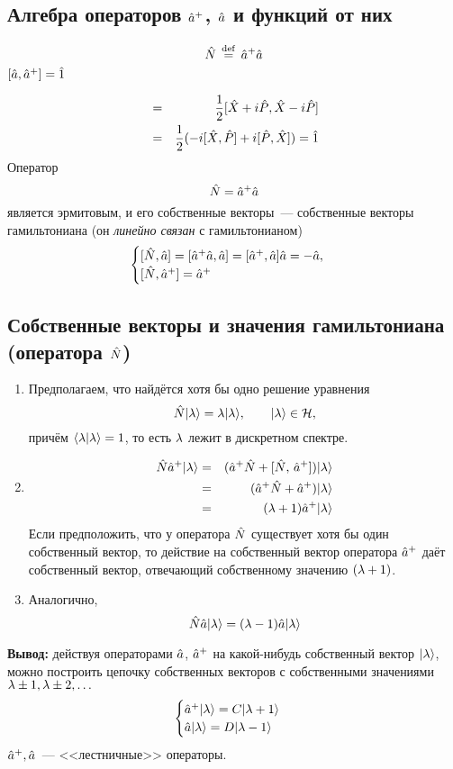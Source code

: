\subsection{Алгебра операторов $\Hat a^+$, $\Hat a$ и функций от них}
$$
    \Hat N \,\overset{\mathrm{def}}{=}\, \Hat a^+ \Hat a
$$
\Lem $[\Hat a, \Hat a^+] = \Hat 1$

\Proof
\begin{eqnarray*}
    [\hat a, \hat a^+] &=& \dfrac12 [\Hat X + i \Hat P, \Hat X - i \hat P]\\
                        &=& \dfrac12 (-i [\Hat X, \Hat P] + i [\Hat P, \Hat X]) = \Hat 1
\end{eqnarray*}
Оператор
$$
    \hat N = \Hat a^+ \Hat a
$$
является эрмитовым, и его собственные векторы~--- собственные векторы гамильтониана (он \emph{линейно связан} с гамильтонианом)
$$
\begin{cases}
    [\Hat N, \Hat a] = [\Hat a^+ \Hat a, \Hat a] = [\Hat a^+, \Hat a]\Hat a = -\Hat a,\\
    [\Hat N, \Hat a^+] = \Hat a^+
\end{cases}
$$
\subsection[Собственные векторы и значения $\Hat H, \Hat N$]{Собственные векторы и значения гамильтониана (оператора $\Hat N$)}
\begin{enumerate}
  \item Предполагаем, что найдётся хотя бы одно решение уравнения
  $$
    \Hat N | \lambda \rangle = \lambda | \lambda \rangle, \qquad | \lambda \rangle \in \mathcal H,
  $$
  причём $\langle \lambda | \lambda \rangle = 1$, то есть $\lambda$ лежит в дискретном спектре.
  \item
  \begin{eqnarray*}
    \Hat N \Hat a^+ | \lambda \rangle &=& (\Hat a^+ \Hat N + [\Hat N, \, \hat a^+]) | \lambda \rangle\\
    &=& (\Hat a^+ \Hat N + \Hat a^+ ) | \lambda \rangle \\
    &=& (\lambda+1) \Hat a^+ | \lambda \rangle
  \end{eqnarray*}
  Если предположить, что у оператора $\Hat N$ существует хотя бы один собственный вектор, то действие на собственный вектор оператора $\Hat a^+$ даёт собственный вектор, отвечающий собственному значению $(\lambda + 1)$.
  \item Аналогично,
  $$
    \Hat N \Hat a | \lambda \rangle = (\lambda - 1) \Hat a | \lambda \rangle
  $$
\end{enumerate}
\textbf{Вывод:}
действуя операторами $\Hat a$, $\Hat a^+$ на какой-нибудь собственный вектор $| \lambda \rangle$, можно построить цепочку собственных векторов с собственными значениями $\lambda \pm 1, \lambda \pm 2, \ldots$
$$
    \begin{cases}
        \Hat a^+ | \lambda \rangle = C | \lambda + 1 \rangle\\
        \Hat a | \lambda \rangle = D | \lambda - 1 \rangle
    \end{cases}
$$
$\Hat a^+, \hat a$~--- <<лестничные>> операторы.
